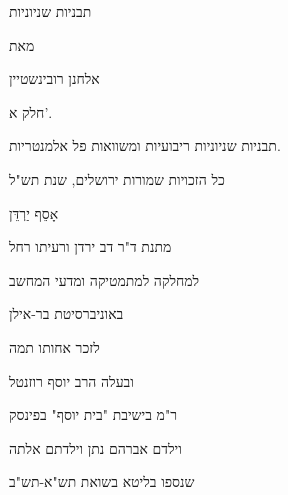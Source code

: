 
\begin{center}

{\huge תבניות שניוניות}

\bigskip
\Large
מאת

\bigskip
{\LARGE אלחנן רובינשטיין}

\bigskip

\bigskip
\large
חלק א'.

\bigskip
תבניות שניוניות ריבועיות ומשוואות פל אלמנטריות.

\vspace{2cm}
\normalsize
כל הזכויות שמורות \hfill ירושלים, שנת תש"ל

\end{center}

\newpage


\begin{center}
\vspace{3cm}
{\large אָסֵף יַרְדֵּן}

\bigskip
מתנת ד"ר דב ירדן ורעיתו רחל

למחלקה למתמטיקה ומדעי המחשב

באוניברסיטת בר-אילן

לזכר אחותו תמה

ובעלה הרב יוסף רוזנטל

ר"מ בישיבת "בית יוסף" בפינסק

וילדם אברהם נתן וילדתם אלתה

שנספו בליטא בשואת תש"א-תש"ב
\end{center}

